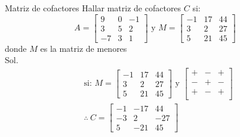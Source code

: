 \begin{Example*} {Matriz de cofactores}
	Hallar matriz de cofactores $C$ si:
	$$ A=\begin{bmatrix}
		9&0&-1\\
		3&5&2\\
		-7&3&1
	\end{bmatrix} \text{ y } M=\begin{bmatrix}
	-1&17&44\\
	3&2&27\\
	5&21&45
	\end{bmatrix} $$
	donde $M$ es la matriz de menores\\
	Sol.
	\begin{align*}
		&\text{si: } M=\begin{bmatrix}
			-1&17&44\\
			3&2&27\\
			5&21&45
		\end{bmatrix} \text{ y } \begin{bmatrix}
			+&-&+\\
			-&+&-\\
			+&-&+\\
		\end{bmatrix}\\
		&\therefore \ C=\begin{bmatrix}
			-1&-17&44\\
			-3&2&-27\\
			5&-21&45
		\end{bmatrix}
	\end{align*}
\end{Example*}
